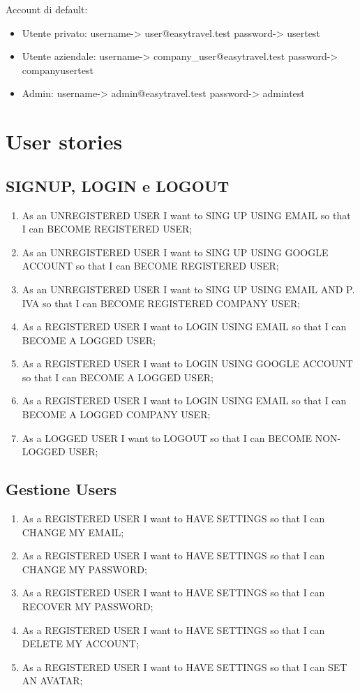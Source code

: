 \documentclass[11pt]{article}
\begin{document}
Account di default:
\begin{itemize}
	\item Utente privato: username-> user@easytravel.test password-> usertest
	\item Utente aziendale: username-> company\_user@easytravel.test password-> companyusertest
	\item Admin: username-> admin@easytravel.test password-> admintest
\end{itemize}


\section{User stories}

\subsection{SIGNUP, LOGIN e LOGOUT}
\begin{enumerate}
	\item As an UNREGISTERED USER I want to SING UP USING EMAIL so that I can BECOME REGISTERED USER;
	\item As an UNREGISTERED USER I want to SING UP USING GOOGLE ACCOUNT so that I can BECOME REGISTERED USER;
	\item As an UNREGISTERED USER I want to SING UP USING EMAIL AND P. IVA so that I can BECOME REGISTERED COMPANY USER;
	\item As a REGISTERED USER I want to LOGIN USING EMAIL so that I can BECOME A LOGGED USER;
	\item As a REGISTERED USER I want to LOGIN USING GOOGLE ACCOUNT so that I can BECOME A LOGGED USER;
	\item As a REGISTERED USER I want to LOGIN USING EMAIL so that I can BECOME A LOGGED COMPANY USER;
	\item As a LOGGED USER I want to LOGOUT so that I can BECOME NON-LOGGED USER;
\end{enumerate}

\subsection{Gestione Users}
\begin{enumerate}
	\item As a REGISTERED USER I want to HAVE SETTINGS so that I can CHANGE MY EMAIL;
	\item As a REGISTERED USER I want to HAVE SETTINGS so that I can CHANGE MY PASSWORD;
	\item As a REGISTERED USER I want to HAVE SETTINGS so that I can RECOVER MY PASSWORD;
	\item As a REGISTERED USER I want to HAVE SETTINGS so that I can DELETE MY ACCOUNT;
	\item As a REGISTERED USER I want to HAVE SETTINGS so that I can SET AN AVATAR;
\end{enumerate}
\end{document}
